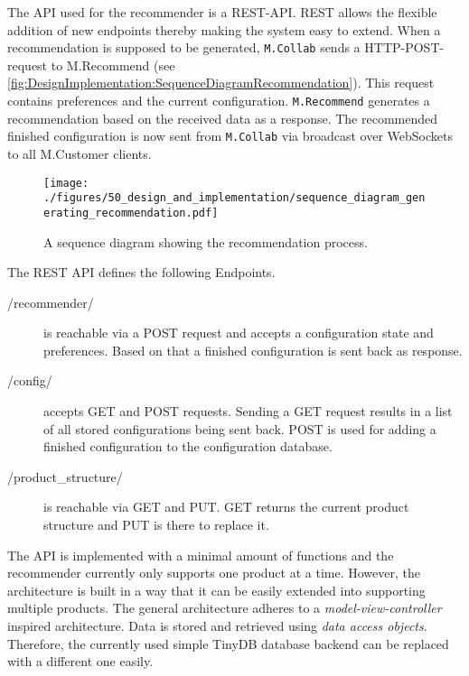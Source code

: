 The API used for the recommender is a REST-API. REST allows the flexible addition of new endpoints thereby making the system easy to extend.
When a recommendation is supposed to be generated, \texttt{M.Collab} sends a HTTP-POST-request to M.Recommend (see \autoref{fig:DesignImplementation:SequenceDiagramRecommendation}). This request contains preferences and the current configuration. \texttt{M.Recommend} generates a recommendation based on the received data as a response. The recommended finished configuration is now sent from  \texttt{M.Collab} via broadcast over WebSockets to all M.Customer clients. 

\begin{figure}[b]
    \centering
    \texttt{[image: ./figures/50\_design\_and\_implementation/sequence\_diagram\_generating\_recommendation.pdf]}
    \caption[Sequence Diagram: Recommendation Generation]{A sequence diagram showing the recommendation process.}
    \label{fig:DesignImplementation:SequenceDiagramRecommendation}
\end{figure}

The REST API defines the following Endpoints.

\begin{description}
    \item[/recommender/] is reachable via a POST request and accepts a configuration state and preferences. Based on that a finished configuration is sent back as response.
    \item[/config/] accepts GET and POST requests. Sending a GET request results in a list of all stored configurations being sent back. POST is used for adding a finished configuration to the configuration database.
    \item[/product\_structure/] is reachable via GET and PUT. GET returns the current product structure and PUT is there to replace it.
\end{description}

The API is implemented with a minimal amount of functions and the recommender currently only supports one product at a time. However, the architecture is built in a way that it can be easily extended into supporting multiple products.
The general architecture adheres to a \emph{model-view-controller} \cite{gamma2015design} inspired architecture.
Data is stored and retrieved using \emph{data access objects}. Therefore, the currently used simple TinyDB database backend can be replaced with a different one easily.

